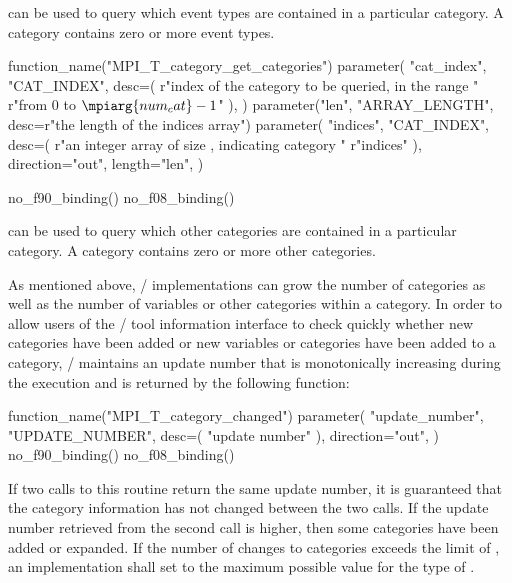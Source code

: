  can be used to query which
event types are contained in a particular category.  A category
contains zero or more event types.

\begin{mpi-binding}
    function_name("MPI_T_category_get_categories")
    parameter(
        "cat_index",
        "CAT_INDEX",
        desc=(
            r"index of the category to be queried, in the range "
            r"from $0$ to $\mpiarg{num_cat}-1$"
        ),
    )
    parameter("len", "ARRAY_LENGTH", desc=r"the length of the indices array")
    parameter(
        "indices",
        "CAT_INDEX",
        desc=(
            r"an integer array of size , indicating category "
            r"indices"
        ),
        direction="out",
        length="len",
    )
    
    no_f90_binding()
    no_f08_binding()
\end{mpi-binding}

 can be used to query which
other categories are contained in a particular category.  A category
contains zero or more other categories.

As mentioned above, \MPI/ implementations can grow the number of categories
as well as the number of variables or other categories within a category.
In order to allow users of the \MPI/ tool information interface to check
quickly whether new categories have been added or new variables or
categories have been added to a category, \MPI/ maintains an update number
that is monotonically increasing during the execution
and is returned by the following function:

\label{sec:mpit:category_changed}
\begin{mpi-binding}
    function_name("MPI_T_category_changed")
    parameter(
        "update_number",
        "UPDATE_NUMBER",
        desc=(
            "update number"
        ),
        direction="out",
    )
    no_f90_binding()
    no_f08_binding()
\end{mpi-binding}

If two calls to this routine return the same update number, it is
guaranteed that the category information has not changed between the two
calls.  If the update number retrieved from the second call is higher, then
some categories have been added or expanded. If the number of changes to
categories exceeds the limit of , an implementation
shall set  to the maximum possible value for the type of .

